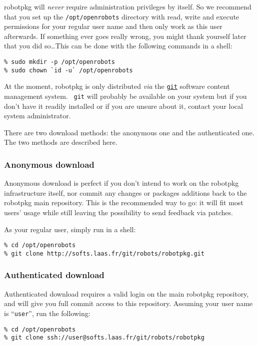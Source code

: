 robotpkg  will {\em never} require administration  privileges by itself.  So we
recommend that you set up the {\tt  /opt/openrobots} directory with read, write
and execute permissions for your regular user  name and then  only work as this
user afterwards. If something ever goes really  wrong, you might thank yourself
later that you did so\ldots This  can be done with  the following commands in a
shell:

\begin{verbatim}
% sudo mkdir -p /opt/openrobots
% sudo chown `id -u` /opt/openrobots
\end{verbatim}

At  the    moment,  robotpkg   is      only   distributed    {\em  via}     the
\href{http://git-scm.com/}{\tt git}  software content  management  system. {\tt
git} will probably be available on your system but if you don't have it readily
installed   or if  you  are   unsure  about  it,   contact your  local   system
administrator.

There are two download methods: the anonymous one and the authenticated
one. The two methods are described here.


\subsubsection{Anonymous download}

Anonymous  download is perfect  if  you don't intend  to  work on  the robotpkg
infrastructure itself, nor commit any changes or packages additions back to the
robotpkg main repository.  This is the recommended way  to go: it will fit most
users' usage while still leaving the possibility to send feedback via patches.

As your regular user, simply run in a shell:

\begin{verbatim}
% cd /opt/openrobots
% git clone http://softs.laas.fr/git/robots/robotpkg.git
\end{verbatim}


\subsubsection{Authenticated download}

Authenticated download requires a valid login  on the main robotpkg repository,
and  will give you  full commit access to this   repository. Assuming your user
name is ``{\tt user}'', run the following:

\begin{verbatim}
% cd /opt/openrobots
% git clone ssh://user@softs.laas.fr/git/robots/robotpkg
\end{verbatim}


